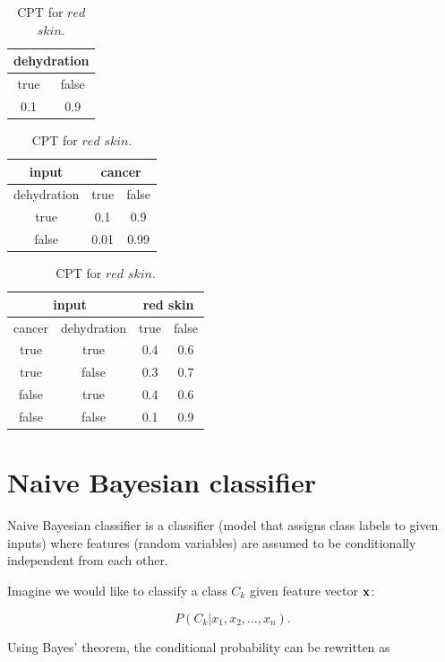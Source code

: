 \documentclass[thesis=B,english]{FITthesis}[2012/06/26]
\begin{document}
\begin{table}
\parbox{0.45\linewidth}{
\centering
\begin{tabular}{|c|c|}
\hline
\multicolumn{2}{|c|}{dehydration}  \\
\hline
true & false \\
\hline
0.1 & 0.9 \\
\hline
\end{tabular}
\caption{CPT for $dehydration$.}
}
\hfill
\parbox{0.45\linewidth}{
\centering
\begin{tabular}{|c||c|c|}
\hline
input & \multicolumn{2}{c|}{cancer} \\
\hline
dehydration & true & false \\
\hline
true & 0.1 & 0.9 \\
\hline
false & 0.01 & 0.99 \\
\hline
\end{tabular}
\caption{CPT for $cancer$.}
}
\centering
\begin{tabular}{|c|c||c|c|}
\hline
\multicolumn{2}{|c||}{input} & \multicolumn{2}{c|}{red skin} \\
\hline
cancer & dehydration & true & false \\
\hline
true & true & 0.4 & 0.6 \\
\hline
true & false & 0.3 & 0.7 \\
\hline
false & true & 0.4 & 0.6 \\
\hline
false & false & 0.1 & 0.9 \\
\hline
\end{tabular}
\caption{CPT for $red$ $skin$.}
\end{table}

\section{Naive Bayesian classifier}

Naive Bayesian classifier is a classifier (model that assigns class labels to given inputs) where features (random variables) are assumed to be conditionally independent from each other.

Imagine we would like to classify a class $C_k$ given feature vector $\textbf x$:

\begin{equation}
P(C_k | x_1, x_2, \dots, x_n).
\end{equation}

Using Bayes' theorem, the conditional probability can be rewritten as
\end{document}
